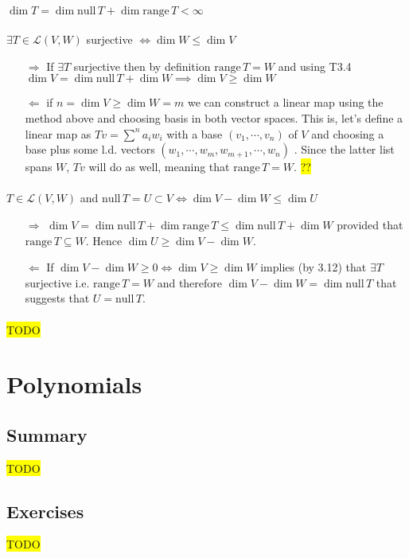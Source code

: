 \documentclass[11pt,notitlepage,oneside]{article}
\newcommand{\hilight}[1]{\colorbox{yellow}{#1}}
\DeclareMathOperator{\dimension}{dim}
\newcommand{\exo}[1]{%
\addtocontents{toc}{\protect\setcounter{tocdepth}{2}}%
\paragraph{#1}}
\newcommand{\nullspace}[1]{\mathrm{null}\,{#1}}
\newcommand{\rangespace}[1]{\mathrm{range}\,{#1}}
\begin{document}
  \exo{} $\dimension{T} = \dimension{\nullspace{T}} + \dimension{\rangespace{T}} < \infty$
  \exo{} $\exists T \in\mathcal{L}(V,W)$ surjective $ \iff \dimension{W}\leq \dimension{V}$
  \begin{itemize}
    \item[$\Rightarrow$] If $\exists T$ surjective then by definition $\rangespace{T} = W$ and using T3.4 
    $\dimension{V} = \dimension{\nullspace{T}} + \dimension{W} \implies \dimension{V}\geq \dimension{W}$
    \item[$\Leftarrow$] if $n=\dimension{V}\geq \dimension{W}=m$ we can construct a linear map using the method above and
    choosing basis in both vector spaces. This is, let's define a linear map as $Tv = \sum^n a_i w_i$ with a base 
    $(v_1, \cdots, v_n)$ of $V$ and choosing a base plus some l.d. vectors $(w_1, \cdots, w_m, w_{m+1}, \cdots, w_n)$ . 
    Since the latter list spans $W$, $Tv$ will do as well, meaning that $\rangespace{T} = W$.
    \hilight{??}
  \end{itemize}
  
  \exo{} $T\in\mathcal{L}(V,W)$ and $\nullspace{T}=U \subset V \iff \dimension{V} - \dimension{W} \leq \dimension{U}$
  \begin{itemize}
  \item[$\Rightarrow$] $\dimension{V}=\dimension{\nullspace{T}} + \dimension{\rangespace{T}}\leq \dimension{\nullspace{T}} + \dimension{W}$ provided that $\rangespace{T}\subseteq W$. Hence $\dimension{U} \geq \dimension{V} - \dimension{W}$. 
  \item[$\Leftarrow$] If $\dimension{V} - \dimension{W} \geq 0 \iff \dimension{V} \geq \dimension{W}$ implies (by 3.12) that $\exists T$ surjective
  i.e. $\rangespace{T} = W$ and therefore $\dimension{V} - \dimension{W} = \dimension{\nullspace{T}}$ that suggests that $U=\nullspace{T}$.
  \end{itemize}
  
  \exo{}
  
  \hilight{TODO}
  \newpage
  \section{Polynomials}
  \subsection*{Summary}
  \hilight{TODO}
  \subsection*{Exercises}
  \setcounter{paragraph}{0}
  \hilight{TODO}
\newpage
{}
\small


\end{document}
